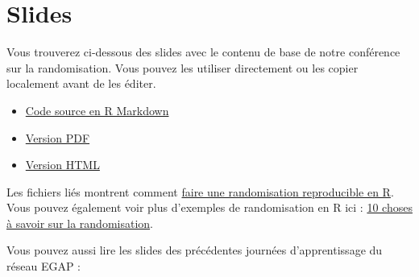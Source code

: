 \documentclass[
  12pt,
]{book}
\begin{document}
\hypertarget{slides-2}{%
\section{Slides}\label{slides-2}}

Vous trouverez ci-dessous des slides avec le contenu de base de notre conférence sur la randomisation. Vous pouvez les utiliser directement ou les copier localement avant de les éditer.

\begin{itemize}
\item
  \href{https://egap.github.io/learningdays-resources/Slides/randomization-slides.Rmd}{Code source en R Markdown}
\item
  \href{https://egap.github.io/learningdays-resources/Slides/randomization-slides.pdf}{Version PDF}
\item
  \href{https://egap.github.io/learningdays-resources/Slides/randomization-slides.html}{Version HTML}
\end{itemize}

Les fichiers liés montrent comment \href{https://egap.github.io/learningdays-resources/Exercises/randomization-exercises.Rmd}{faire une randomisation reproducible en R}.
Vous pouvez également voir plus d'exemples de randomisation en R ici : \href{https://egap.org/resource/10-things-to-know-about-randomization/}{10 choses à savoir sur la randomisation}.

Vous pouvez aussi lire les slides des précédentes journées d'apprentissage du réseau EGAP :
\end{document}
